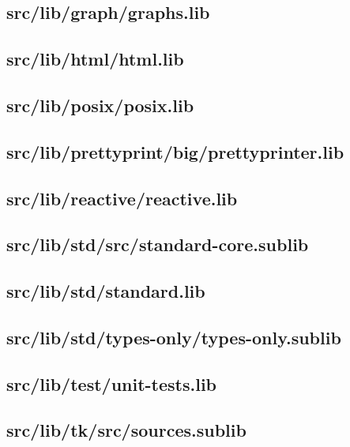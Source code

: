 \subsection{src/lib/graph/graphs.lib}


\subsection{src/lib/html/html.lib}


\subsection{src/lib/posix/posix.lib}


\subsection{src/lib/prettyprint/big/prettyprinter.lib}


\subsection{src/lib/reactive/reactive.lib}


\subsection{src/lib/std/src/standard-core.sublib}


\subsection{src/lib/std/standard.lib}


\subsection{src/lib/std/types-only/types-only.sublib}


\subsection{src/lib/test/unit-tests.lib}


\subsection{src/lib/tk/src/sources.sublib}


